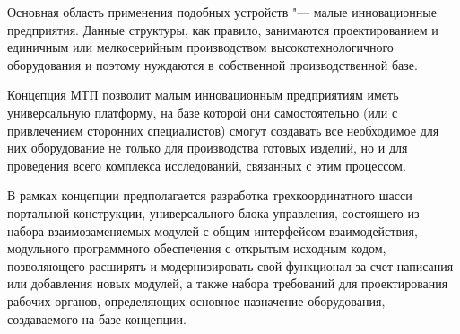 Основная область применения подобных устройств "--- малые инновационные предприятия. Данные структуры, как правило, занимаются проектированием и единичным или мелкосерийным производством высокотехнологичного оборудования и поэтому нуждаются в собственной производственной базе.

Концепция МТП позволит малым инновационным предприятиям иметь универсальную платформу, на базе которой они самостоятельно (или с привлечением сторонних специалистов) смогут создавать все необходимое для них оборудование не только для производства готовых изделий, но и для проведения всего комплекса исследований, связанных с этим процессом.

В рамках концепции предполагается разработка трехкоординатного шасси портальной конструкции, универсального блока управления, состоящего из набора взаимозаменяемых модулей с общим интерфейсом взаимодействия, модульного программного обеспечения с открытым исходным кодом, позволяющего расширять и модернизировать свой функционал за счет написания или добавления новых модулей, а также набора требований для проектирования рабочих органов, определяющих основное назначение оборудования, создаваемого на базе концепции.


\FloatBarrier


\FloatBarrier